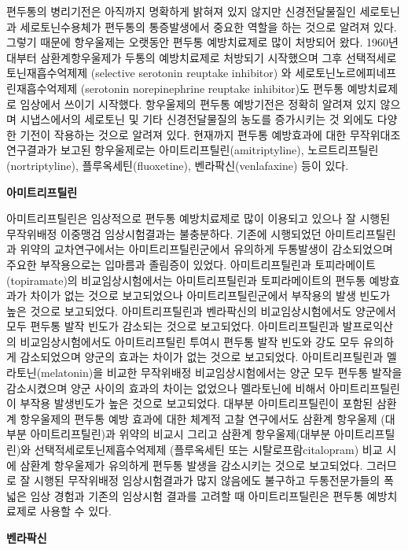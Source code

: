 \documentclass[]{book}
\begin{document}
편두통의 병리기전은 아직까지 명확하게 밝혀져 있지 않지만 신경전달물질인 세로토닌과 세로토닌수용체가 편두통의 통증발생에서 중요한 역할을 하는 것으로 알려져 있다. 그렇기 때문에 항우울제는 오랫동안 편두통 예방치료제로 많이 처방되어 왔다. 1960년대부터 삼환계항우울제가 두통의 예방치료제로 처방되기 시작했으며 그후 선택적세로토닌재흡수억제제 (selective serotonin reuptake inhibitor) 와 세로토닌노르에피네프린재흡수억제제 (serotonin norepinephrine reuptake inhibitor)도 편두통 예방치료제로 임상에서 쓰이기 시작했다. 항우울제의 편두통 예방기전은 정확히 알려져 있지 않으며 시냅스에서의 세로토닌 및 기타 신경전달물질의 농도를 증가시키는 것 외에도 다양한 기전이 작용하는 것으로 알려져 있다. 현재까지 편두통 예방효과에 대한 무작위대조연구결과가 보고된 항우울제로는 아미트리프틸린(amitriptyline), 노르트리프틸린(nortriptyline), 플루옥세틴(fluoxetine), 벤라팍신(venlafaxine) 등이 있다.

\textbf{아미트리프틸린}

아미트리프틸린은 임상적으로 편두통 예방치료제로 많이 이용되고 있으나 잘 시행된 무작위배정 이중맹검 임상시험결과는 불충분하다. 기존에 시행되었던 아미트리프틸린과 위약의 교차연구에서는 아미트리프틸린군에서 유의하게 두통발생이 감소되었으며 주요한 부작용으로는 입마름과 졸림증이 있었다. 아미트리프틸린과 토피라메이트(topiramate)의 비교임상시험에서는 아미트리프틸린과 토피라메이트의 편두통 예방효과가 차이가 없는 것으로 보고되었으나 아미트리프틸린군에서 부작용의 발생 빈도가 높은 것으로 보고되었다. 아미트리프틸린과 벤라팍신의 비교임상시험에서도 양군에서 모두 편두통 발작 빈도가 감소되는 것으로 보고되었다. 아미트리프틸린과 발프로익산의 비교임상시험에서도 아미트리프틸린 투여시 편두통 발작 빈도와 강도 모두 유의하게 감소되었으며 양군의 효과는 차이가 없는 것으로 보고되었다. 아미트리프틸린과 멜라토닌(melatonin)을 비교한 무작위배정 비교임상시험에서는 양군 모두 편두통 발작을 감소시켰으며 양군 사이의 효과의 차이는 없었으나 멜라토닌에 비해서 아미트리프틸린이 부작용 발생빈도가 높은 것으로 보고되었다. 대부분 아미트리프틸린이 포함된 삼환계 항우울제의 편두통 예방 효과에 대한 체계적 고찰 연구에서도 삼환계 항우울제 (대부분 아미트리프틸린)과 위약의 비교시 그리고 삼환계 항우울제(대부분 아미트리프틸린)와 선택적세로토닌제흡수억제제 (플루옥세틴 또는 시탈로프람citalopram) 비교 시에 삼환계 항우울제가 유의하게 편두통 발생을 감소시키는 것으로 보고되었다. 그러므로 잘 시행된 무작위배정 임상시험결과가 많지 않음에도 불구하고 두통전문가들의 폭넓은 임상 경험과 기존의 임상시험 결과를 고려할 때 아미트리프틸린은 편두통 예방치료제로 사용할 수 있다.

\textbf{벤라팍신}
\end{document}

